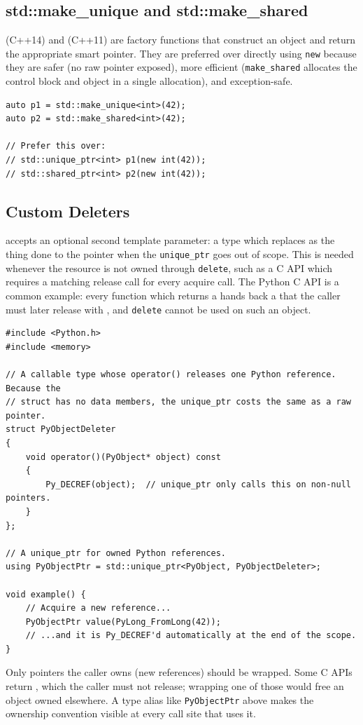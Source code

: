 \subsection{std::make\_unique and std::make\_shared}
 (C++14) and  (C++11) are factory functions that construct an object and return the appropriate smart pointer. They are preferred over directly using \texttt{new} because they are safer (no raw pointer exposed), more efficient (\texttt{make\_shared} allocates the control block and object in a single allocation), and exception-safe.
\begin{lstlisting}
auto p1 = std::make_unique<int>(42);
auto p2 = std::make_shared<int>(42);

// Prefer this over:
// std::unique_ptr<int> p1(new int(42));
// std::shared_ptr<int> p2(new int(42));
\end{lstlisting}

\subsection{Custom Deleters}\label{section:cpp_custom_deleters}

 accepts an optional second template parameter: a  type which replaces  as the thing done to the pointer when the \texttt{unique\_ptr} goes out of scope. This is needed whenever the resource is not owned through \texttt{delete}, such as a C API which requires a matching release call for every acquire call. The Python C API is a common example: every function which returns a  hands back a  that the caller must later release with , and \texttt{delete} cannot be used on such an object.
\begin{lstlisting}
#include <Python.h>
#include <memory>

// A callable type whose operator() releases one Python reference. Because the
// struct has no data members, the unique_ptr costs the same as a raw pointer.
struct PyObjectDeleter
{
    void operator()(PyObject* object) const
    {
        Py_DECREF(object);  // unique_ptr only calls this on non-null pointers.
    }
};

// A unique_ptr for owned Python references.
using PyObjectPtr = std::unique_ptr<PyObject, PyObjectDeleter>;

void example() {
    // Acquire a new reference...
    PyObjectPtr value(PyLong_FromLong(42));
    // ...and it is Py_DECREF'd automatically at the end of the scope.
}
\end{lstlisting}
Only pointers the caller owns (new references) should be wrapped. Some C APIs return , which the caller must not release; wrapping one of those would free an object owned elsewhere. A type alias like \texttt{PyObjectPtr} above makes the ownership convention visible at every call site that uses it.


